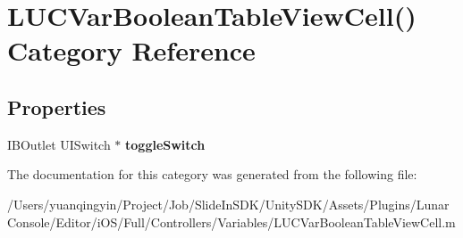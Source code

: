 \hypertarget{category_l_u_c_var_boolean_table_view_cell_07_08}{}\section{L\+U\+C\+Var\+Boolean\+Table\+View\+Cell() Category Reference}
\label{category_l_u_c_var_boolean_table_view_cell_07_08}
\subsection*{Properties}
\begin{DoxyCompactItemize}
\item 
\mbox{\label{category_l_u_c_var_boolean_table_view_cell_07_08_a5f458736f8f6715a5be99b183a39efd6}} 
I\+B\+Outlet U\+I\+Switch $\ast$ {\bfseries toggle\+Switch}
\end{DoxyCompactItemize}


The documentation for this category was generated from the following file\+:\begin{DoxyCompactItemize}
\item 
/\+Users/yuanqingyin/\+Project/\+Job/\+Slide\+In\+S\+D\+K/\+Unity\+S\+D\+K/\+Assets/\+Plugins/\+Lunar\+Console/\+Editor/i\+O\+S/\+Full/\+Controllers/\+Variables/L\+U\+C\+Var\+Boolean\+Table\+View\+Cell.\+m\end{DoxyCompactItemize}
